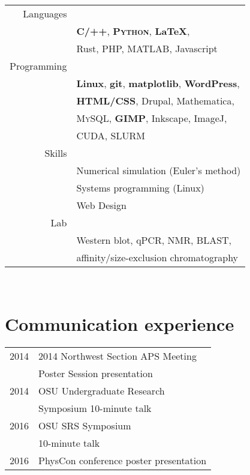 \documentclass[10pt]{article} %
\begin{document}
{\begin{minipage}[t]{0.44\textwidth}
\begin{tabular}{rl}
  Languages\\
  & \textbf{\textsc{C/++}}, \textbf{\textsc{Python}}, \textbf{\LaTeX},\\
  & Rust, PHP, MATLAB, Javascript\\
  Programming\\
  & \textbf{Linux}, \textbf{git}, \textbf{matplotlib}, \textbf{WordPress},\\
  & \textbf{HTML/CSS}, Drupal, Mathematica,\\
  & \textsc{MySQL}, \textbf{GIMP}, Inkscape, ImageJ,\\
  & CUDA, SLURM \\
  Skills\\
  &Numerical simulation (Euler's method)\\
  &Systems programming (Linux)\\
  &Web Design\\
  Lab\\
  & Western blot, qPCR, NMR, BLAST,\\
  & affinity/size-exclusion chromatography\\
\end{tabular}\\


\section{Communication experience} 

\begin{tabular}{rl}
  2014 & 2014 Northwest Section APS Meeting\\
  & Poster Session presentation\\
  2014 & OSU Undergraduate Research\\
  & Symposium 10-minute talk\\
  2016 & OSU SRS Symposium\\
  & 10-minute talk\\
  2016 & PhysCon conference poster presentation\\
\end{tabular} \\



\end{minipage}}
\end{document}
